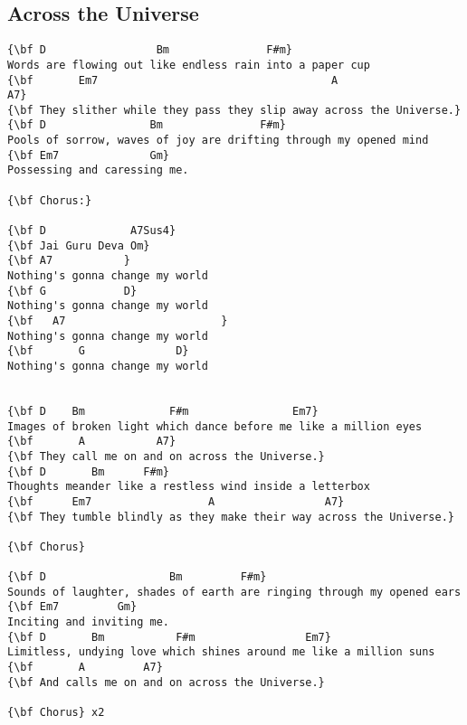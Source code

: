 \documentclass[a4paper]{article}
\begin{document}
\subsection{Across the Universe} %
\label{sub:Across the Universe}
\begin{Verbatim}[commandchars=\\\{\}]
{\bf D                 Bm               F#m}
Words are flowing out like endless rain into a paper cup
{\bf       Em7                                    A                  A7}
{\bf They slither while they pass they slip away across the Universe.}
{\bf D                Bm               F#m}
Pools of sorrow, waves of joy are drifting through my opened mind
{\bf Em7              Gm}
Possessing and caressing me.

{\bf Chorus:}

{\bf D             A7Sus4}
{\bf Jai Guru Deva Om}
{\bf A7			  }
Nothing's gonna change my world
{\bf G			  D}
Nothing's gonna change my world
{\bf   A7			             }
Nothing's gonna change my world
{\bf       G			  D}
Nothing's gonna change my world


{\bf D	  Bm		     F#m	   		    Em7}
Images of broken light which dance before me like a million eyes
{\bf       A		   A7}
{\bf They call me on and on across the Universe.}
{\bf D		 Bm		 F#m}
Thoughts meander like a restless wind inside a letterbox
{\bf      Em7			       A                 A7}
{\bf They tumble blindly as they make their way across the Universe.}

{\bf Chorus}

{\bf D                   Bm			F#m}
Sounds of laughter, shades of earth are ringing through my opened ears
{\bf Em7	     Gm}
Inciting and inviting me.
{\bf D	     Bm		      F#m			      Em7}
Limitless, undying love which shines around me like a million suns
{\bf       A	     A7}
{\bf And calls me on and on across the Universe.}

{\bf Chorus} x2

\end{Verbatim}
\newpage
\end{document}
